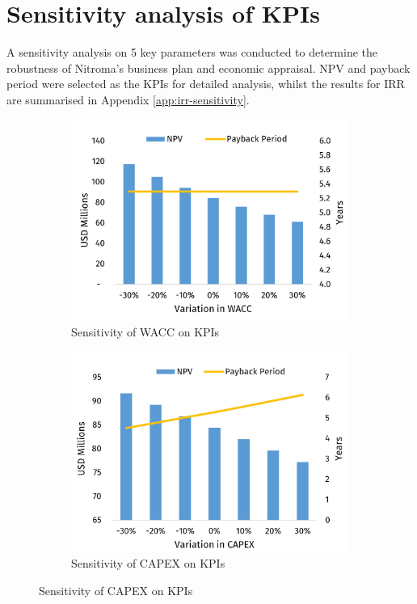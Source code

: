 \section{Sensitivity analysis of KPIs}
\label{sec:sensitivities-kpis}
A sensitivity analysis on 5 key parameters was conducted to determine the robustness of Nitroma’s business plan and economic appraisal. NPV and payback period were selected as the KPIs for detailed analysis, whilst the results for IRR are summarised in Appendix \ref{app:irr-sensitivity}. 

\begin{figure}[h]
\centering
\begin{subfigure}[b]{.40\linewidth}
\includegraphics[width=\linewidth]{chapters/6-economics/figures/Sensitivity_WACC.jpg}
\caption{Sensitivity of WACC on KPIs}\label{Sensitivity_WACC}
\end{subfigure}
\begin{subfigure}[b]{.40\linewidth}
\includegraphics[width=\linewidth]{chapters/6-economics/figures/Sensitivity_CAPEX.jpg}
\caption{Sensitivity of CAPEX on KPIs}\label{Sensitivity_CAPEX}


\end{subfigure}
\end{figure}
